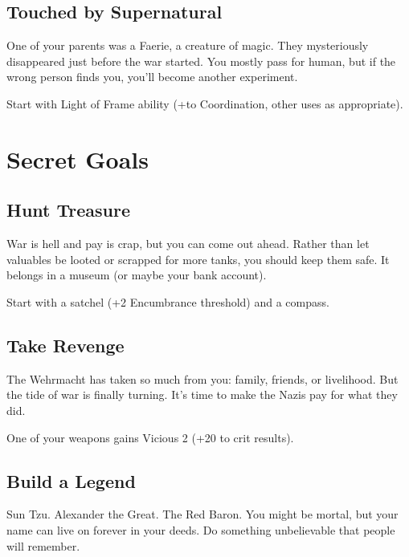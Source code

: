 \documentclass{book}
\newcommand{\bbb}{\BoostDie }
\begin{document}
\begin{multicols}{2}
\subsection{Touched by Supernatural}

One of your parents was a Faerie, a creature of magic.  They mysteriously disappeared just before the war started.  You mostly pass for human, but if the wrong person finds you, you'll become another experiment.

Start with Light of Frame ability (+\bbb to Coordination, other uses as appropriate).

\section{Secret Goals}

\subsection{Hunt Treasure}

War is hell and pay is crap, but you can come out ahead.  Rather than let valuables be looted or scrapped for more tanks, you should keep them safe.  It belongs in a museum (or maybe your bank account).

Start with a satchel (+2 Encumbrance threshold) and a compass.


\subsection{Take Revenge}

The Wehrmacht has taken so much from you: family, friends, or livelihood.  But the tide of war is finally turning.  It's time to make the Nazis pay for what they did.

One of your weapons gains Vicious 2 (+20 to crit results).

\subsection{Build a Legend}

Sun Tzu.  Alexander the Great.  The Red Baron.  You might be mortal, but your name can live on forever in your deeds.  Do something unbelievable that people will remember.


\end{multicols}
\end{document}
